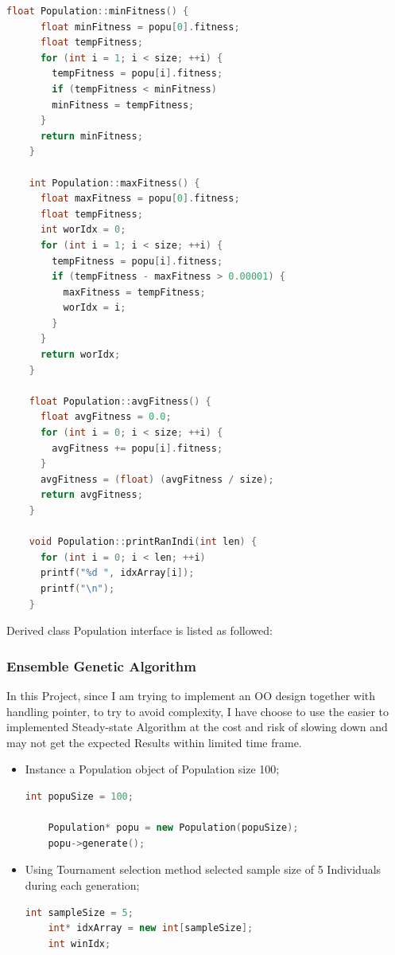 \documentclass{article}
\begin{document}
\begin{CJK}{UTF8}{gbsn}
\begin{itemize}
\begin{lstlisting}[language=c++]
    float Population::minFitness() {
      float minFitness = popu[0].fitness;
      float tempFitness;
      for (int i = 1; i < size; ++i) {
        tempFitness = popu[i].fitness;
        if (tempFitness < minFitness)
        minFitness = tempFitness;
      }
      return minFitness;
    }

    int Population::maxFitness() {
      float maxFitness = popu[0].fitness;
      float tempFitness;
      int worIdx = 0;
      for (int i = 1; i < size; ++i) {
        tempFitness = popu[i].fitness;
        if (tempFitness - maxFitness > 0.00001) {
          maxFitness = tempFitness;
          worIdx = i;
        }
      }
      return worIdx;
    }

    float Population::avgFitness() {
      float avgFitness = 0.0;
      for (int i = 0; i < size; ++i) {
        avgFitness += popu[i].fitness;
      }
      avgFitness = (float) (avgFitness / size);
      return avgFitness;
    }

    void Population::printRanIndi(int len) {
      for (int i = 0; i < len; ++i)
      printf("%d ", idxArray[i]);
      printf("\n");
    }
  \end{lstlisting}
\end{itemize}

Derived class Population interface is listed as followed: 


\subsubsection{Ensemble Genetic Algorithm}
In this Project, since I am trying to implement an OO design together with handling pointer, to try to avoid complexity, I have choose to use the easier to implemented Steady-state Algorithm at the cost and risk of slowing down and may not get the expected Results within limited time frame.

\begin{itemize}
  \itemsep=-3pt
\item Instance a Population object of Population size 100;
  \begin{lstlisting}[language=c++]
    int popuSize = 100;

    Population* popu = new Population(popuSize);
    popu->generate();
  \end{lstlisting}

\item Using Tournament selection method selected sample size of 5 Individuals during each generation; 
  \begin{lstlisting}[language=c++]
    int sampleSize = 5;
    int* idxArray = new int[sampleSize];
    int winIdx;


\end{lstlisting}
\end{itemize}
\end{CJK}
\end{document}
